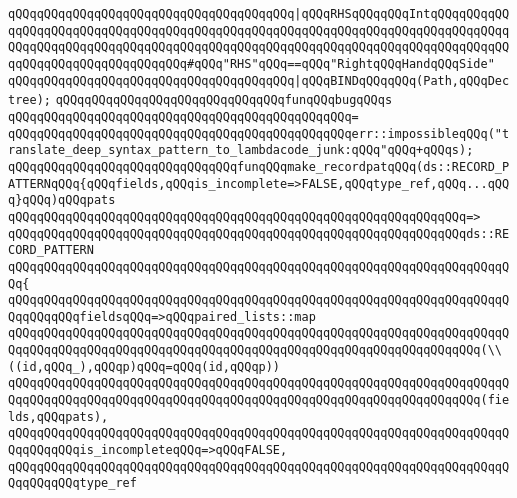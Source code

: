 \verb|qQQqqQQqqQQqqQQqqQQqqQQqqQQqqQQqqQQqqQQq|\verb#|qQQqRHSqQQqqQQqIntqQQqqQQqqQQqqQQqqQQqqQQqqQQqqQQqqQQqqQQqqQQqqQQqqQQqqQQqqQQqqQQqqQQqqQQqqQQqqQQqqQQqqQQqqQQqqQQqqQQqqQQqqQQqqQQqqQQqqQQqqQQqqQQqqQQqqQQqqQQqqQQqqQQqqQQqqQQqqQQqqQQqqQQqqQQqqQQq#\verb|#qQQq"RHS"qQQq==qQQq"RightqQQqHandqQQqSide"|\newline
\verb|qQQqqQQqqQQqqQQqqQQqqQQqqQQqqQQqqQQqqQQq|\verb#|qQQqBINDqQQqqQQq(Path,qQQqDectree);#\newline
\newline
\verb|qQQqqQQqqQQqqQQqqQQqqQQqqQQqqQQqfunqQQqbugqQQqs|\newline
\verb|qQQqqQQqqQQqqQQqqQQqqQQqqQQqqQQqqQQqqQQqqQQqqQQq=|\newline
\verb|qQQqqQQqqQQqqQQqqQQqqQQqqQQqqQQqqQQqqQQqqQQqqQQqerr::impossibleqQQq("translate_deep_syntax_pattern_to_lambdacode_junk:qQQq"qQQq+qQQqs);|\newline
\newline
\verb|qQQqqQQqqQQqqQQqqQQqqQQqqQQqqQQqfunqQQqmake_recordpatqQQq(ds::RECORD_PATTERNqQQq{qQQqfields,qQQqis_incomplete=>FALSE,qQQqtype_ref,qQQq...qQQq}qQQq)qQQqpats|\newline
\verb|qQQqqQQqqQQqqQQqqQQqqQQqqQQqqQQqqQQqqQQqqQQqqQQqqQQqqQQqqQQqqQQq=>|\newline
\verb|qQQqqQQqqQQqqQQqqQQqqQQqqQQqqQQqqQQqqQQqqQQqqQQqqQQqqQQqqQQqqQQqds::RECORD_PATTERN|\newline
\verb|qQQqqQQqqQQqqQQqqQQqqQQqqQQqqQQqqQQqqQQqqQQqqQQqqQQqqQQqqQQqqQQqqQQqqQQq{|\newline
\verb|qQQqqQQqqQQqqQQqqQQqqQQqqQQqqQQqqQQqqQQqqQQqqQQqqQQqqQQqqQQqqQQqqQQqqQQqqQQqqQQqfieldsqQQq=>qQQqpaired_lists::map|\newline
\verb|qQQqqQQqqQQqqQQqqQQqqQQqqQQqqQQqqQQqqQQqqQQqqQQqqQQqqQQqqQQqqQQqqQQqqQQqqQQqqQQqqQQqqQQqqQQqqQQqqQQqqQQqqQQqqQQqqQQqqQQqqQQqqQQqqQQqqQQq(\\((id,qQQq_),qQQqp)qQQq=qQQq(id,qQQqp))|\newline
\verb|qQQqqQQqqQQqqQQqqQQqqQQqqQQqqQQqqQQqqQQqqQQqqQQqqQQqqQQqqQQqqQQqqQQqqQQqqQQqqQQqqQQqqQQqqQQqqQQqqQQqqQQqqQQqqQQqqQQqqQQqqQQqqQQqqQQqqQQq(fields,qQQqpats),|\newline
\newline
\verb|qQQqqQQqqQQqqQQqqQQqqQQqqQQqqQQqqQQqqQQqqQQqqQQqqQQqqQQqqQQqqQQqqQQqqQQqqQQqqQQqis_incompleteqQQq=>qQQqFALSE,|\newline
\newline
\verb|qQQqqQQqqQQqqQQqqQQqqQQqqQQqqQQqqQQqqQQqqQQqqQQqqQQqqQQqqQQqqQQqqQQqqQQqqQQqqQQqtype_ref|\newline
